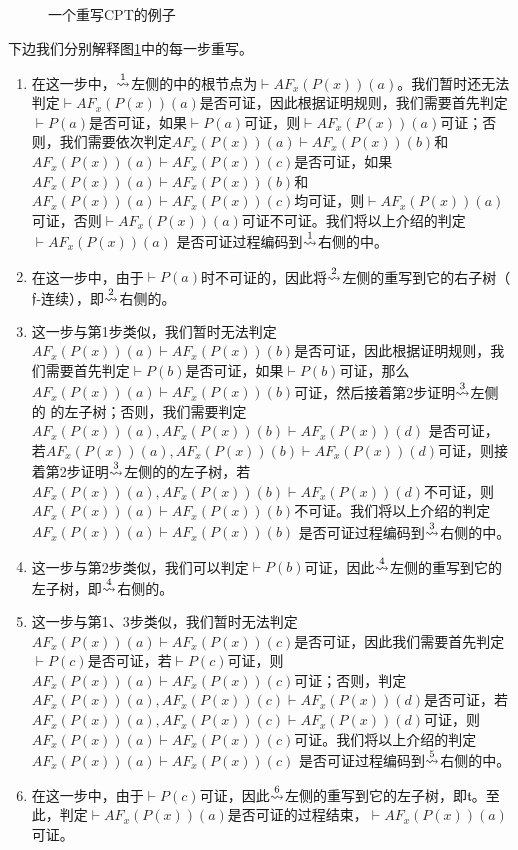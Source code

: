 \begin{example}
\begin{figure}[h!]
{{		}}
		\caption{一个重写\textsf{CPT}的例子}
		\label{fig:cpt:rewriting}
	\end{figure}
	下边我们分别解释图\ref{fig:cpt:rewriting}中的每一步重写。
	\begin{enumerate}
		\item 在这一步中，$\stackrel{1}{\rightsquigarrow}$左侧的\CPT{}中的根节点为$\vdash AF_x(P(x))(a)$。我们暂时还无法判定$\vdash AF_x(P(x))(a)$是否可证，因此根据证明规则，我们需要首先判定$\vdash P(a)$是否可证，如果$\vdash P(a)$可证，则$\vdash AF_x(P(x))(a)$可证；否则，我们需要依次判定$AF_x(P(x))(a)\vdash AF_x(P(x))(b)$和$AF_x(P(x))(a)\vdash AF_x(P(x))(c)$是否可证，如果$AF_x(P(x))(a)\vdash AF_x(P(x))(b)$和$AF_x(P(x))(a)\vdash AF_x(P(x))(c)$均可证，则$\vdash AF_x(P(x))(a)$可证，否则$\vdash AF_x(P(x))(a)$可证不可证。我们将以上介绍的判定 $\vdash AF_x(P(x))(a)$ 是否可证过程编码到$\stackrel{1}{\rightsquigarrow}$右侧的\CPT{}中。
		\item 在这一步中，由于$\vdash P(a)$时不可证的，因此将$\stackrel{2}{\rightsquigarrow}$左侧的\CPT{}重写到它的右子树（$\mathfrak{f}$-连续），即$\stackrel{2}{\rightsquigarrow}$右侧的\CPT{}。
		\item 这一步与第1步类似，我们暂时无法判定$AF_x(P(x))(a)\vdash AF_x(P(x))(b)$是否可证，因此根据证明规则，我们需要首先判定$\vdash P(b)$是否可证，如果$\vdash P(b)$可证，那么$AF_x(P(x))(a)\vdash AF_x(P(x))(b)$可证，然后接着第2步证明$\stackrel{3}{\rightsquigarrow}$左侧的 \CPT{} 的左子树；否则，我们需要判定$AF_x(P(x))(a), AF_x(P(x))(b)\vdash AF_x(P(x))(d)$ 是否可证，若$AF_x(P(x))(a), AF_x(P(x))(b)\vdash AF_x(P(x))(d)$可证，则接着第2步证明$\stackrel{3}{\rightsquigarrow}$左侧的\CPT{}的左子树，若$AF_x(P(x))(a), AF_x(P(x))(b)\vdash AF_x(P(x))(d)$不可证，则$AF_x(P(x))(a)\vdash AF_x(P(x))(b)$不可证。我们将以上介绍的判定 $AF_x(P(x))(a)\vdash AF_x(P(x))(b)$ 是否可证过程编码到$\stackrel{3}{\rightsquigarrow}$右侧的\CPT{}中。
		\item 这一步与第2步类似，我们可以判定$\vdash P(b)$可证，因此$\stackrel{4}{\rightsquigarrow}$左侧的\CPT{}重写到它的左子树，即$\stackrel{4}{\rightsquigarrow}$右侧的\CPT{}。
		\item 这一步与第1、3步类似，我们暂时无法判定$AF_x(P(x))(a)\vdash AF_x(P(x))(c)$是否可证，因此我们需要首先判定$\vdash P(c)$是否可证，若$\vdash P(c)$可证，则$AF_x(P(x))(a)\vdash AF_x(P(x))(c)$可证；否则，判定$AF_x(P(x))(a), AF_x(P(x))(c)\vdash AF_x(P(x))(d)$是否可证，若$AF_x(P(x))(a), AF_x(P(x))(c)\vdash AF_x(P(x))(d)$可证，则$AF_x(P(x))(a)\vdash AF_x(P(x))(c)$可证。我们将以上介绍的判定 $AF_x(P(x))(a)\vdash AF_x(P(x))(c)$ 是否可证过程编码到$\stackrel{5}{\rightsquigarrow}$右侧的\CPT{}中。
		\item 在这一步中，由于$\vdash P(c)$可证，因此$\stackrel{6}{\rightsquigarrow}$左侧的\CPT{}重写到它的左子树，即$\mathfrak{t}$。至此，判定$\vdash AF_x(P(x))(a)$是否可证的过程结束，$\vdash AF_x(P(x))(a)$可证。
	\end{enumerate}
\end{example}



